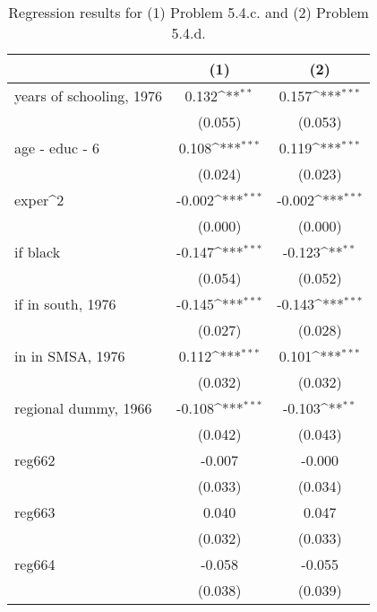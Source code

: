 \begin{table}[htbp]\centering
\def\sym#1{\ifmmode^{#1}\else\(^{#1}\)\fi}
\caption{Regression results for (1) Problem 5.4.c. and (2) Problem 5.4.d.}
\begin{tabular}{l*{2}{c}}
\toprule
                    &\multicolumn{1}{c}{(1)}         &\multicolumn{1}{c}{(2)}         \\
\midrule
years of schooling, 1976&       0.132\sym{**} &       0.157\sym{***}\\
                    &     (0.055)         &     (0.053)         \\
\addlinespace
age - educ - 6      &       0.108\sym{***}&       0.119\sym{***}\\
                    &     (0.024)         &     (0.023)         \\
\addlinespace
exper^2             &      -0.002\sym{***}&      -0.002\sym{***}\\
                    &     (0.000)         &     (0.000)         \\
\addlinespace
=1 if black         &      -0.147\sym{***}&      -0.123\sym{**} \\
                    &     (0.054)         &     (0.052)         \\
\addlinespace
=1 if in south, 1976&      -0.145\sym{***}&      -0.143\sym{***}\\
                    &     (0.027)         &     (0.028)         \\
\addlinespace
=1 in in SMSA, 1976 &       0.112\sym{***}&       0.101\sym{***}\\
                    &     (0.032)         &     (0.032)         \\
\addlinespace
regional dummy, 1966&      -0.108\sym{***}&      -0.103\sym{**} \\
                    &     (0.042)         &     (0.043)         \\
\addlinespace
reg662              &      -0.007         &      -0.000         \\
                    &     (0.033)         &     (0.034)         \\
\addlinespace
reg663              &       0.040         &       0.047         \\
                    &     (0.032)         &     (0.033)         \\
\addlinespace
reg664              &      -0.058         &      -0.055         \\
                    &     (0.038)         &     (0.039)         \\

\end{tabular}
\end{table}
